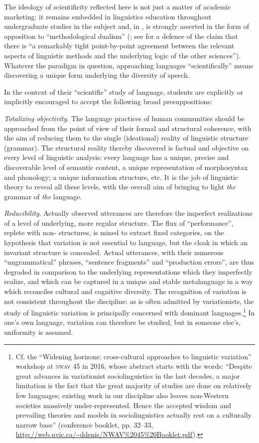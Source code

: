 \documentclass[output=paper]{langscibook}
\begin{document}
\noindent The ideology of scientificity reflected here is not just a matter of academic marketing: it remains embedded in linguistics education throughout undergraduate studies in the subject and, in , is strongly asserted in the form of opposition to ``methodological dualism'' (\citealt{Chomsky1995}; see \citealt[367]{Johnson2007} for a defence of the claim that there is ``a remarkably tight point-by-point agreement between the relevant aspects of linguistic methods and the underlying logic of the other sciences''). Whatever the paradigm in question, approaching languages ``scientifically'' means discovering a unique form underlying the diversity of speech.

In the context of their ``scientific'' study of language, students are explicitly or implicitly encouraged to accept the following broad presuppositions:

\emph{Totalizing objectivity}. The language practices of human communities should be approached from the point of view of their formal and structural coherence, with the aim of reducing them to the single (ideational) reality of linguistic structure (grammar). The structural reality thereby discovered is factual and objective on every level of linguistic analysis: every language has a unique, precise and discoverable level of semantic content, a unique representation of morphosyntax and phonology; a unique information structure, etc. It is the job of linguistic theory to reveal all these levels, with the overall aim of bringing to light \emph{the} grammar of \emph{the} language.

\emph{Reducibility}. Actually observed utterances are therefore the imperfect realizations of a level of underlying, more regular structure. The flux of ``performance'', replete with non- structures, is mined to extract fixed categories, on the hypothesis that variation is not essential to language, but the cloak in which an invariant structure is concealed. Actual utterances, with their numerous ``ungrammatical'' phrases, ``sentence fragments'' and ``production errors'', are thus degraded in comparison to the underlying representations which they imperfectly realize, and which can be captured in a unique and stable metalanguage in a way which reconciles cultural and cognitive diversity. The recognition of variation is not consistent throughout the discipline: as is often admitted by variationists, the study of linguistic variation is principally concerned with dominant languages.\footnote{Cf. the ``Widening horizons: cross-cultural approaches to linguistic variation'' workshop at \textsc{nwav} 45 in 2016, whose abstract starts with the words: ``Despite great advances in variationist sociolinguistics in the last decades, a major limitation is the fact that the great majority of studies are done on relatively few languages; existing work in our discipline also leaves non-Western societies massively under-represented. Hence the accepted wisdom and prevailing theories and models in sociolinguistics actually rest on a culturally narrow base'' (conference booklet, pp. 32--33, \url{http://web.uvic.ca/~ddenis/NWAV\%2045\%20Booklet.pdf}).} In one's own language, variation can therefore be studied, but in someone else's, uniformity is assumed.
\end{document}
